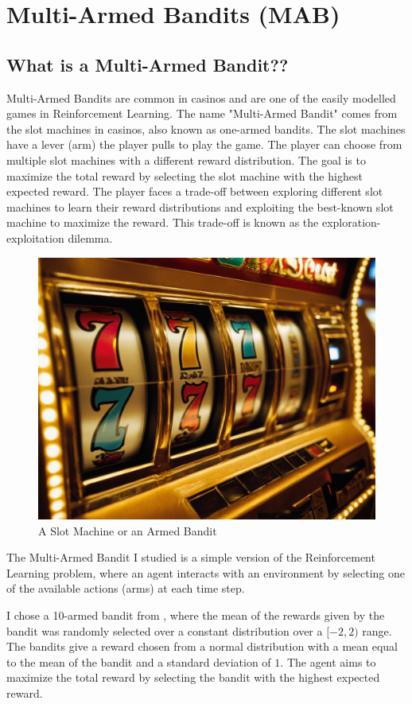 \section{Multi-Armed Bandits (MAB)}

\subsection{What is a Multi-Armed Bandit??}

Multi-Armed Bandits are common in casinos and are one of the easily modelled games in Reinforcement Learning. The name "Multi-Armed Bandit" comes from the slot machines in casinos, also known as one-armed bandits. The slot machines have a lever (arm) the player pulls to play the game. The player can choose from multiple slot machines with a different reward distribution. The goal is to maximize the total reward by selecting the slot machine with the highest expected reward. The player faces a trade-off between exploring different slot machines to learn their reward distributions and exploiting the best-known slot machine to maximize the reward. This trade-off is known as the exploration-exploitation dilemma.

\begin{figure}[h]
    \centering
    \includegraphics[width=0.5\linewidth]{images/mab.png}
    \caption{A Slot Machine or an Armed Bandit}
    \label{fig:mab}
\end{figure}

The Multi-Armed Bandit I studied is a simple version of the Reinforcement Learning problem, where an agent interacts with an environment by selecting one of the available actions (arms) at each time step.

I chose a 10-armed bandit from \cite{sutton2018reinforcement}, where the mean of the rewards given by the bandit was randomly selected over a constant distribution over a $[-2,2)$ range. The bandits give a reward chosen from a normal distribution with a mean equal to the mean of the bandit and a standard deviation of $1$. The agent aims to maximize the total reward by selecting the bandit with the highest expected reward.

